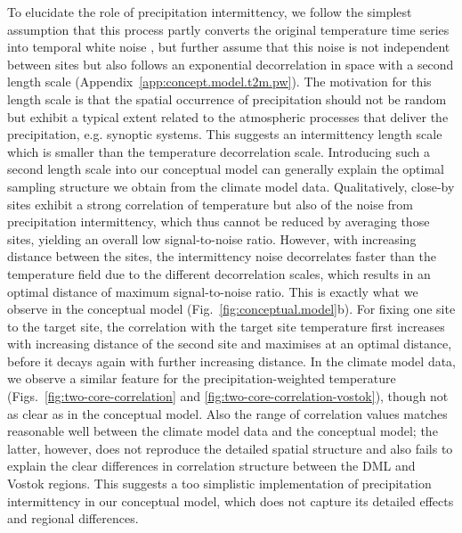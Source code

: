 \documentclass[cp, manuscript]{copernicus}
\begin{document}
To elucidate the role of precipitation intermittency, we follow the simplest
assumption that this process partly converts the original temperature time
series into temporal white noise \citep{Laepple2018}, but further assume that
this noise is not independent between sites but also follows an exponential
decorrelation in space with a second length scale
(Appendix~\ref{app:concept.model.t2m.pw}). The motivation for this length scale
is that the spatial occurrence of precipitation should not be random but exhibit
a typical extent related to the atmospheric processes that deliver the
precipitation, e.g. synoptic systems. This suggests an intermittency length
scale which is smaller than the temperature decorrelation scale.  Introducing
such a second length scale into our conceptual model can generally explain the
optimal sampling structure we obtain from the climate model data. Qualitatively,
close-by sites exhibit a strong correlation of temperature but also of the noise
from precipitation intermittency, which thus cannot be reduced by averaging
those sites, yielding an overall low signal-to-noise ratio. However, with
increasing distance between the sites, the intermittency noise decorrelates
faster than the temperature field due to the different decorrelation scales,
which results in an optimal distance of maximum signal-to-noise ratio. This is
exactly what we observe in the conceptual model
(Fig.~\ref{fig:conceptual.model}b). For fixing one site to the target site, the
correlation with the target site temperature  first increases with increasing
distance of the second site and maximises at an optimal distance, before it
decays again with further increasing distance. In the climate model data, we
observe a similar feature for the precipitation-weighted temperature
(Figs.~\ref{fig:two-core-correlation} and
\ref{fig:two-core-correlation-vostok}), though not as clear as in the conceptual
model. Also the range of correlation values matches reasonable well between the
climate model data and the conceptual model; the latter, however, does not
reproduce the detailed spatial structure and also fails to explain the clear
differences in correlation structure between the DML and Vostok regions. This
suggests a too simplistic implementation of precipitation intermittency in our
conceptual model, which does not capture its detailed effects and regional
differences.
\end{document}
